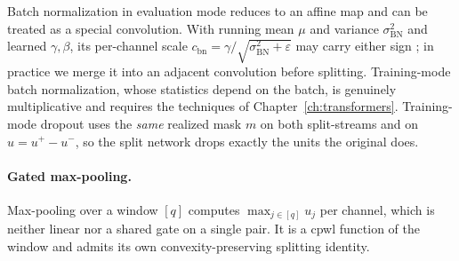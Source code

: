\begin{table}[htbp]
	\centering
	\caption[Linear CNN chunks]{Linear \ac{cnn} chunks as instances of Lemma~\ref{lem:linear_chunk}; $p$ is the dropout probability.}
	\label{tab:linear_chunks}
%
\end{table}

Batch normalization in evaluation mode reduces to an affine map and can be treated as a special convolution. With running mean $\mu$ and variance $\sigma_{\mathrm{BN}}^2$ and learned $\gamma,\beta$, its per-channel scale $c_{\mathrm{bn}}=\gamma/\sqrt{\sigma_{\mathrm{BN}}^2+\varepsilon}$ may carry either sign \parencite{Guillemot2020BreakingBN,Hui2019BNDecomposition}; in practice we merge it into an adjacent convolution before splitting. Training-mode batch normalization, whose statistics depend on the batch, is genuinely multiplicative and requires the techniques of Chapter~\ref{ch:transformers}. Training-mode dropout uses the \emph{same} realized mask $m$ on both split-streams and on $u = u^+ - u^-$, so the split network drops exactly the units the original does.

\paragraph{Gated max-pooling.}
Max-pooling over a window $[q]$ computes $\max_{j \in [q]} u_j$ per channel, which is neither linear nor a shared gate on a single pair. It is a \ac{cpwl} function of the window and admits its own convexity-preserving splitting identity.

